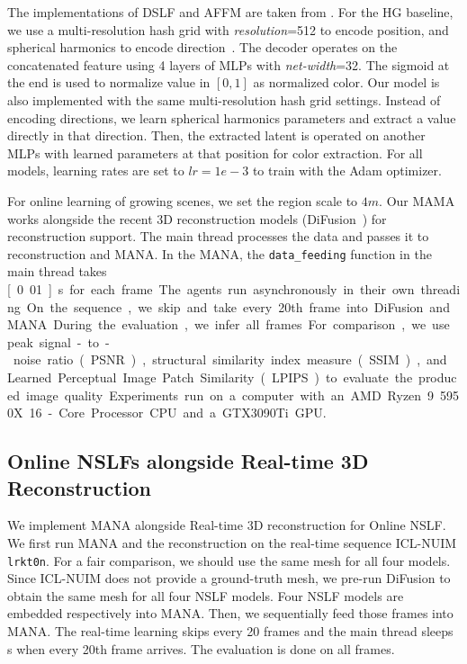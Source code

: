 The implementations of DSLF and AFFM are taken from \cite{yu2022anisotropic}.
For the HG baseline, we use a multi-resolution hash grid with \textsl{resolution}=512 to encode position, and spherical harmonics to encode direction~\cite{muller2022instant}.
The decoder operates on the concatenated feature using 4 layers of MLPs with \textsl{net-width}=32. The sigmoid at the end is used to normalize value in $[0,1]$ as normalized color.
Our model is also implemented with the same multi-resolution hash grid settings. Instead of encoding directions, we learn spherical harmonics parameters and extract a value directly in that direction.
Then, the extracted latent is operated on another MLPs with learned parameters at that position for color extraction.
For all models, learning rates are set to $lr=1e-3$ to train with the Adam optimizer. 

For online learning of growing scenes, we set the region scale to $4m$.
Our MAMA works alongside the recent 3D reconstruction models (DiFusion~\cite{huang2021di}) for reconstruction support.
The main thread processes the data and passes it to reconstruction and MANA.
In the MANA, the \texttt{data\_feeding} function in the main thread takes \unit[0.01]{s} for each frame.
The agents run asynchronously in their own threading.
On the sequence, we skip and take every 20th frame into DiFusion and MANA.
During the evaluation, we infer all frames.


For comparison, we use peak signal-to-noise ratio (PSNR), structural similarity index measure (SSIM), and Learned Perceptual Image Patch Similarity (LPIPS) to evaluate the produced image quality. 

Experiments run on a computer with an AMD Ryzen 9 5950X 16-Core Processor CPU and a GTX3090Ti GPU. 




\subsection{Online NSLFs alongside Real-time 3D Reconstruction}
\label{sec:test:online}
We implement MANA alongside Real-time 3D reconstruction for Online NSLF.
We first run MANA and the reconstruction on the real-time sequence ICL-NUIM \texttt{lrkt0n}.
For a fair comparison, we should use the same mesh for all four models.
Since ICL-NUIM does not provide a ground-truth mesh, we pre-run DiFusion to obtain the same mesh for all four NSLF models.
Four NSLF models are embedded respectively into MANA.
Then, we sequentially feed those frames into MANA.
The real-time learning skips every 20 frames and the main thread sleeps \unit[1]{s} when every 20th frame arrives.
The evaluation is done on all frames. 

